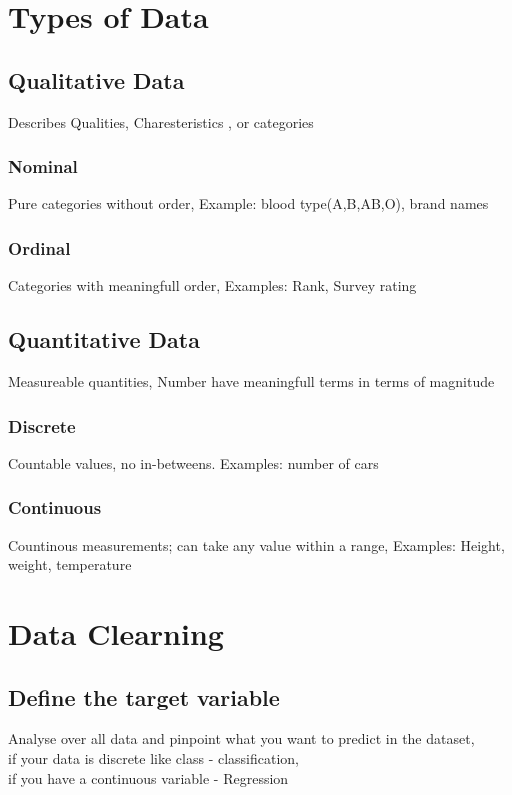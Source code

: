 \documentclass[12pt]{extarticle}
\begin{document}
\section{Types of Data}
\subsection{Qualitative Data}
Describes Qualities, Charesteristics , or categories
\subsubsection{Nominal}
Pure categories without order, 
Example: blood type(A,B,AB,O), brand names
\subsubsection{Ordinal}
Categories with meaningfull order,
Examples: Rank, Survey rating
\subsection{Quantitative Data}
Measureable quantities, Number have meaningfull terms in terms of magnitude
\subsubsection{Discrete}
Countable values, no in-betweens. 
Examples: number of cars
\subsubsection{Continuous}
Countinous measurements; can take any value within a range, 
Examples: Height, weight, temperature

\section{Data Clearning}

\subsection{Define the target variable}
Analyse over all data and pinpoint what you want to predict in the dataset, \\
if your data is discrete like class - classification, \\
if you have a continuous variable - Regression\\
\end{document}
